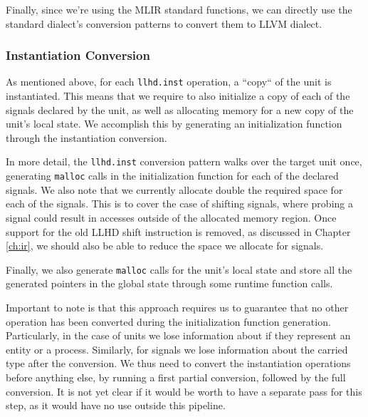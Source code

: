 Finally, since we're using the MLIR standard functions, we can directly use the standard dialect's conversion patterns to convert them to LLVM dialect.


\subsubsection{Instantiation Conversion}
As mentioned above, for each \texttt{llhd.inst} operation, a “copy“ of the unit is instantiated. This means that we require to also initialize a copy of each of the signals declared by the unit, as well as allocating memory for a new copy of the unit's local state. We accomplish this by generating an initialization function through the instantiation conversion.

In more detail, the \texttt{llhd.inst} conversion pattern walks over the target unit once,  generating \texttt{malloc} calls in the initialization function for each of the declared signals. We also note that we currently allocate double the required space for each of the signals. This is to cover the case of shifting signals, where probing a signal could result in accesses outside of the allocated memory region. Once support for the old LLHD shift instruction is removed, as discussed in Chapter \ref{ch:ir}, we should also be able to reduce the space we allocate for signals.

Finally, we also generate \texttt{malloc} calls for the unit's local state and store all the generated pointers in the global state through some runtime function calls.

Important to note is that this approach requires us to guarantee that no other operation has been converted during the initialization function generation. Particularly, in the case of units we lose information about if they represent an entity or a process. Similarly, for signals we lose information about the carried type after the conversion. We thus need to convert the instantiation operations before anything else, by running a first partial conversion, followed by the full conversion. It is not yet clear if it would be worth to have a separate pass for this step, as it would have no use outside this pipeline.


